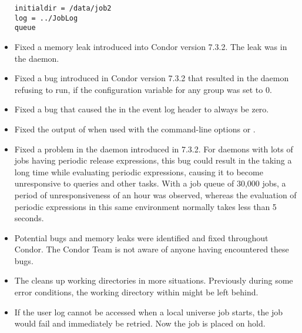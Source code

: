\begin{itemize}
\begin{verbatim}
initialdir = /data/job2
log = ../JobLog
queue
\end{verbatim}


\item Fixed a memory leak introduced into Condor version 7.3.2.
The leak was in the  daemon.

\item Fixed a bug introduced in Condor version 7.3.2
that resulted in the  daemon
refusing to run, if the configuration variable 
for any group was set to 0.

\item Fixed a bug that caused the  in the event log header
  to always be zero.

\item Fixed the output of  when used with the command-line
  options  or .

\item Fixed a problem in the  daemon introduced in
  7.3.2.  For  daemons with lots of jobs having periodic release
  expressions, this bug could result in the  taking a long
  time while evaluating periodic expressions, causing it to become
  unresponsive to queries and other tasks.
  With a job queue of 30,000 jobs,
  a period of unresponsiveness of an hour was observed,
  whereas the evaluation of periodic expressions in this same environment
  normally takes less than 5 seconds.

\item Potential bugs and memory leaks were identified and 
fixed throughout Condor.  The Condor Team is not aware of anyone having 
encountered these bugs.

\item The  cleans up working directories in more
situations.  Previously during some error conditions, the working
directory within  might be left behind.

\item If the user log cannot be accessed when a local universe
job starts, the job would fail and immediately be retried.  Now
the job is placed on hold.


\end{itemize}
